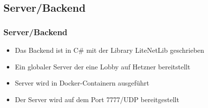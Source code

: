 \documentclass{beamer}
\begin{document}
\subsection{Server/Backend}
\begin{frame}
\frametitle{Server/Backend}
  \begin{itemize}
    \item Das Backend ist in C\# mit der Library LiteNetLib geschrieben
    \item Ein globaler Server der eine Lobby auf Hetzner bereitstellt
    \item Server wird in Docker-Containern ausgeführt
    \item Der Server wird auf dem Port 7777/UDP bereitgestellt
  \end{itemize}
\end{frame}
\end{document}
